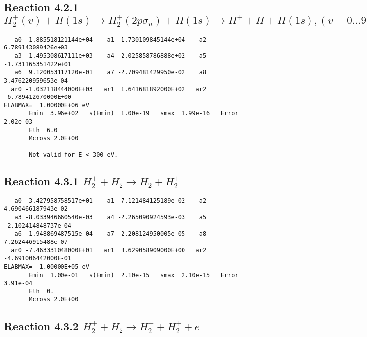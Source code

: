 \documentclass[12pt,dvipdfm]{article}
\begin{document}
\newpage
\subsection{
Reaction 4.2.1 $H_2^+(v) + H(1s) \rightarrow H_2^+(2p\sigma_u) + H(1s) \rightarrow H^+ + H + H(1s), (v=0\ldots 9)$}












\begin{small}\begin{verbatim}
   a0  1.885518121144e+04    a1 -1.730109845144e+04    a2  6.789143089426e+03
   a3 -1.495308617111e+03    a4  2.025858786888e+02    a5 -1.731165351422e+01
   a6  9.120053117120e-01    a7 -2.709481429950e-02    a8  3.476220959653e-04
  ar0 -1.032118444000E+03   ar1  1.641681892000E+02   ar2 -6.789412670000E+00
ELABMAX=  1.00000E+06 eV
       Emin  3.96e+02   s(Emin)  1.00e-19   smax  1.99e-16   Error  2.02e-03
       Eth  6.0
       Mcross 2.0E+00

       Not valid for E < 300 eV.
\end{verbatim}\end{small}

\newpage
\subsection{
Reaction 4.3.1 $   H_2^+ + H_2 \rightarrow H_2 + H_2^+$}


\begin{small}\begin{verbatim}
   a0 -3.427958758517e+01    a1 -7.121484125189e-02    a2  4.690466187943e-02
   a3 -8.033946660540e-03    a4 -2.265090924593e-03    a5 -2.102414848737e-04
   a6  1.948869487515e-04    a7 -2.208124950005e-05    a8  7.262446915488e-07
  ar0 -7.463331048000E+01   ar1  8.629058909000E+00   ar2 -4.691006442000E-01
ELABMAX=  1.00000E+05 eV
       Emin  1.00e-01   s(Emin)  2.10e-15   smax  2.10e-15   Error  3.91e-04
       Eth  0.
       Mcross 2.0E+00
\end{verbatim}\end{small}

\newpage
\subsection{
Reaction 4.3.2 $   H_2^+ + H_2 \rightarrow H_2^+ + H_2^+ + e$}
\end{document}
